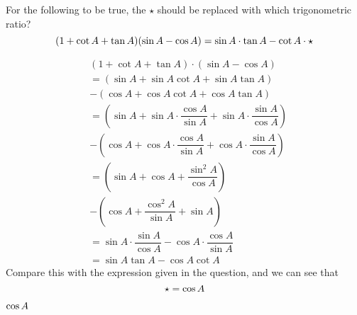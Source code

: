 

\question[2] For the following to be true, the $\star$ 
should be replaced with which trigonometric ratio?
\[ (1+\cot A+\tan A)(\sin A-\cos A)=\sin A\cdot\tan A-\cot A\cdot \star \]

\watchout

\begin{solution}[\halfpage]
  \begin{align}
    &( 1 + \cot A + \tan A)\cdot(\sin A - \cos A) \nonumber \\
    &=(\sin A + \sin A\cot A + \sin A\tan A) \nonumber \\
    &- (\cos A + \cos A\cot A + \cos A \tan A) \\
    &= \left(\sin A +\sin A\cdot\dfrac{\cos A}{\sin A} + \sin A\cdot\dfrac{\sin A}{\cos A}\right) \nonumber \\
    &- \left( \cos A +\cos A\cdot\dfrac{\cos A}{\sin A} + \cos A\cdot\dfrac{\sin A}{\cos A} \right) \\
    &= \left(\sin A + \cos A + \dfrac{\sin^2 A}{\cos A} \right) \nonumber \\
    &- \left(\cos A + \dfrac{\cos^2 A}{\sin A} + \sin A\right) \\
    &= \sin A\cdot\dfrac{\sin A}{\cos A} - \cos A\cdot\dfrac{\cos A}{\sin A} \\
    &= \sin A\tan A - \cos A\cot A
  \end{align}
  Compare this with the expression given in the question, and we can see that 
  \[ \star = \cos A \]
\end{solution}
\ifprintanswers\begin{codex}$\cos A$\end{codex}\fi
